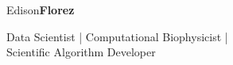 \begin{center}
    {\fontsize{50}{40}\selectfont Edison\bf Florez}

    \Large{
        Data Scientist | Computational Biophysicist | \\
        Scientific Algorithm Developer
    }
\end{center}
